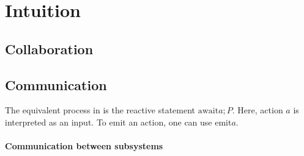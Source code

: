 


\section{Intuition}
\label{sec:comparison}


\subsection{Collaboration}

\subsection{Communication}

The equivalent process in \ESTEREL is the reactive statement $\text{await} a; P$.
Here, action $a$ is interpreted as an input.
To emit an action, one can use $\text{emit} a$.

\paragraph{Communication between subsystems}


